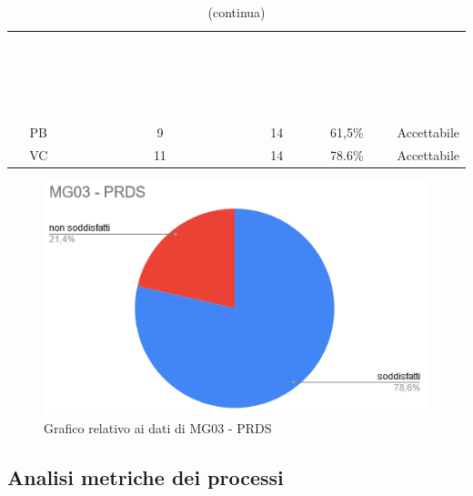 \begin{longtable}{c c c c c}
\rowcolor{white}\caption{Esiti MG03 - PRDS}\\
		\rowcolor{redafk}
		\textcolor{white}{\textbf{Periodo}} &
\textcolor{white}{\textbf{Requisiti Desiderabili Soddisfatti}} & \textcolor{white}{\textbf{Totale}} & 
\textcolor{white}{\textbf{Percentuale}} & \textcolor{white}{\textbf{Esito}}\\
		\endfirsthead
		\rowcolor{white}\caption[]{(continua)} \\
		\rowcolor{redafk}
		\textcolor{white}{\textbf{Periodo}} &
\textcolor{white}{\textbf{Requisiti Desiderabili Soddisfatti}} & \textcolor{white}{\textbf{Totale}} & 
\textcolor{white}{\textbf{Percentuale}} & \textcolor{white}{\textbf{Esito}}\\
		\endhead
		PB & 9 & 14 & 61,5\% & Accettabile \\
		VC & 11 & 14 & 78.6\% & Accettabile \\
\end{longtable}

\begin{figure}[H]
\centering
\includegraphics[scale=0.7]{./img/MG03.png}
\caption{Grafico relativo ai dati di MG03 - PRDS}
\end{figure}

\subsection{Analisi metriche dei processi}
